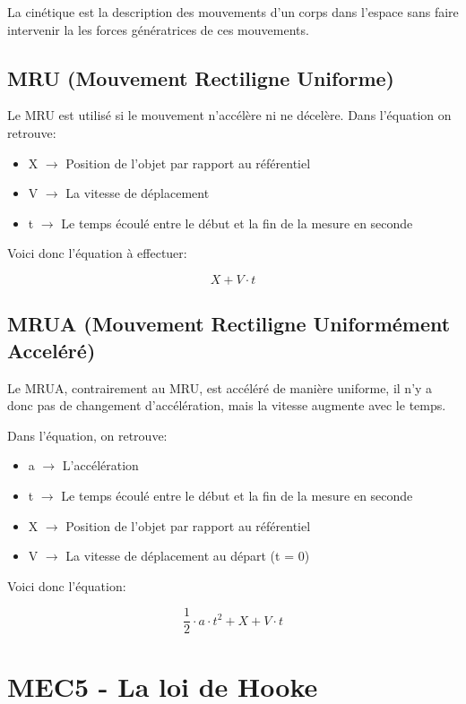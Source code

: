 \documentclass{article}
\begin{document}
La cinétique est la description des mouvements d'un corps dans l'espace sans faire
intervenir la les forces génératrices de ces mouvements.

\subsection{MRU (Mouvement Rectiligne Uniforme)}

Le MRU est utilisé si le mouvement n'accélère ni ne décelère. Dans l'équation on retrouve:
\begin{itemize}
	\item X $\rightarrow$ Position de l'objet par rapport au référentiel
	\item V $\rightarrow$ La vitesse de déplacement
	\item t $\rightarrow$ Le temps écoulé entre le début et la fin de la mesure en seconde
\end{itemize}

Voici donc l'équation à effectuer:

\begin{equation}
  X + V \cdot t
\end{equation}

\subsection{MRUA (Mouvement Rectiligne Uniformément Acceléré)}

Le MRUA, contrairement au MRU, est accéléré de manière uniforme, il n'y a donc pas de changement d'accélération, mais la vitesse augmente avec le temps.

Dans l'équation, on retrouve:
\begin{itemize}
	\item a $\rightarrow$ L'accélération
	\item t $\rightarrow$ Le temps écoulé entre le début et la fin de la mesure en seconde
	\item X $\rightarrow$ Position de l'objet par rapport au référentiel
	\item V $\rightarrow$ La vitesse de déplacement au départ (t = 0)
\end{itemize}

Voici donc l'équation:

\begin{equation}
	\frac{1}{2} \cdot a \cdot t^2 + X + V \cdot t
\end{equation}

\pagebreak
\section{MEC5 - La loi de Hooke}
\end{document}
